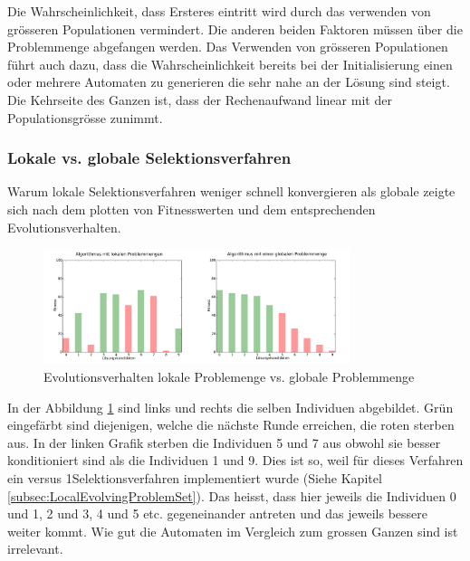 Die Wahrscheinlichkeit, dass Ersteres eintritt wird durch das verwenden von grösseren Populationen vermindert. Die anderen beiden Faktoren müssen über die Problemmenge abgefangen werden. Das Verwenden von grösseren Populationen führt auch dazu, dass die Wahrscheinlichkeit bereits bei der Initialisierung einen oder mehrere Automaten zu generieren die sehr nahe an der Lösung sind steigt. Die Kehrseite des Ganzen ist, dass der Rechenaufwand linear mit der Populationsgrösse zunimmt.

\subsubsection{Lokale vs. globale Selektionsverfahren}
Warum lokale Selektionsverfahren weniger schnell konvergieren als globale zeigte sich nach dem plotten von Fitnesswerten und dem entsprechenden Evolutionsverhalten.

\begin{figure}[ht]
  \centering
  \includegraphics[width=0.8\textwidth]{images/evolutionsverhalten_lokal_vs_global.pdf}
  \caption[Evolutionsverhalten lokale Problemenge vs. globale Problemmenge]{Evolutionsverhalten lokale Problemenge vs. globale Problemmenge}
  \label{fig:evolutionsverhalten_lokal_vs_global}
\end{figure}

In der Abbildung \ref{fig:evolutionsverhalten_lokal_vs_global} sind links und rechts die selben Individuen abgebildet. Grün eingefärbt sind diejenigen, welche die nächste Runde erreichen, die roten sterben aus. In der linken Grafik sterben die Individuen 5 und 7 aus obwohl sie besser konditioniert sind als die Individuen 1 und 9. Dies ist so, weil für dieses Verfahren ein  versus 1\frqq Selektionsverfahren implementiert wurde (Siehe Kapitel \ref{subsec:LocalEvolvingProblemSet}). Das heisst, dass hier jeweils die Individuen 0 und 1, 2 und 3, 4 und 5 etc. gegeneinander antreten und das jeweils bessere weiter kommt. Wie gut die Automaten im Vergleich zum grossen Ganzen sind ist irrelevant.